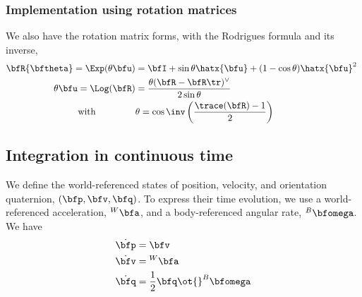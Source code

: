 \subsubsection{Implementation using rotation matrices}
We also have the rotation matrix forms, with the Rodrigues formula and its inverse,
%
\begin{subequations}
\begin{align}
\bfR\{\bth\} = \Exp(\theta\bfu) &= \bfI + \sin\theta\hatx{\bfu} + (1-\cos\theta)\hatx{\bfu}^2~ \label{equ:rodrigues} \\
\theta\bfu = \Log(\bfR) &= \frac{\theta(\bfR-\bfR\tr)^\vee}{2\sin\theta} \\
\textrm{ with ~~~~~~~~~~~~} &\theta=\cos\inv\left(\frac{\trace(\bfR)-1}{2}\right) 
\end{align}
\end{subequations}

\subsection{Integration in continuous time}

We define the world-referenced states of position, velocity, and orientation quaternion, $(\bfp,\bfv,\bfq)$. 
%
To express their time evolution, we use a world-referenced acceleration, ${}^W\bfa$, and a body-referenced angular rate, ${}^B\bw$. 
We have
%
\begin{align}\label{equ:cont_basic}
\dot\bfp &= \bfv \\
\dot\bfv &= {}^W\bfa \\
\dot\bfq &= \frac12\bfq\ot{}^B\bw 
\end{align}
%




